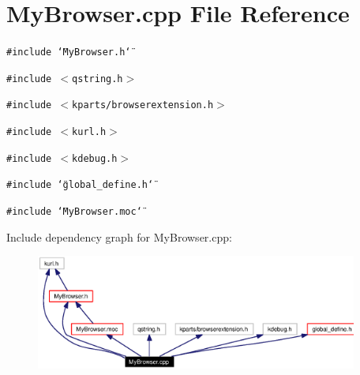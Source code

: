 \section{My\-Browser.cpp File Reference}
\label{MyBrowser_8cpp}


{\tt \#include \char`\"{}My\-Browser.h\char`\"{}}\par
{\tt \#include $<$qstring.h$>$}\par
{\tt \#include $<$kparts/browserextension.h$>$}\par
{\tt \#include $<$kurl.h$>$}\par
{\tt \#include $<$kdebug.h$>$}\par
{\tt \#include \char`\"{}global\_\-define.h\char`\"{}}\par
{\tt \#include \char`\"{}My\-Browser.moc\char`\"{}}\par


Include dependency graph for My\-Browser.cpp:\begin{figure}[H]
\begin{center}
\leavevmode
\includegraphics[width=300pt]{MyBrowser_8cpp__incl}
\end{center}
\end{figure}
